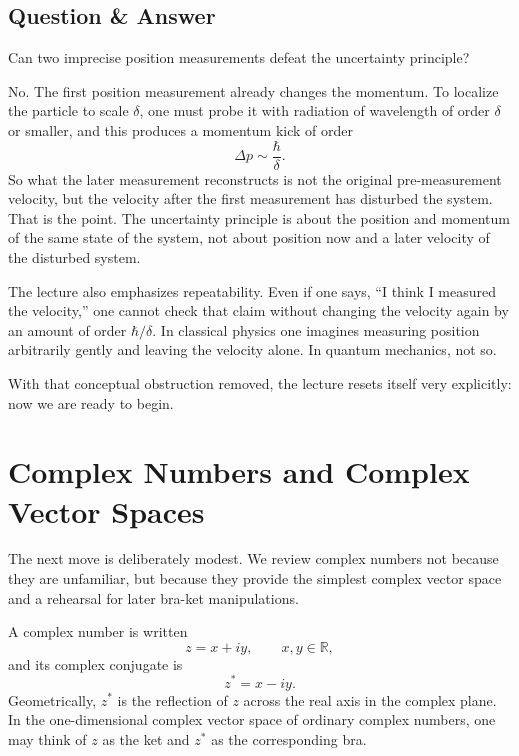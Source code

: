 \subsection{Question \& Answer}

Can two imprecise position measurements defeat the uncertainty principle?

No. The first position measurement already changes the momentum. To localize the particle to scale \(\delta\), one must probe it with radiation of wavelength of order \(\delta\) or smaller, and this produces a momentum kick of order
\begin{equation}
\Delta p \sim \frac{\hbar}{\delta}.
\end{equation}
So what the later measurement reconstructs is not the original pre-measurement velocity, but the velocity after the first measurement has disturbed the system. That is the point. The uncertainty principle is about the position and momentum of the same state of the system, not about position now and a later velocity of the disturbed system.

The lecture also emphasizes repeatability. Even if one says, ``I think I measured the velocity,'' one cannot check that claim without changing the velocity again by an amount of order \(\hbar/\delta\). In classical physics one imagines measuring position arbitrarily gently and leaving the velocity alone. In quantum mechanics, not so.

With that conceptual obstruction removed, the lecture resets itself very explicitly: now we are ready to begin.

\section{Complex Numbers and Complex Vector Spaces}

The next move is deliberately modest. We review complex numbers not because they are unfamiliar, but because they provide the simplest complex vector space and a rehearsal for later bra-ket manipulations.

A complex number is written
\begin{equation}
z = x + i y,
\qquad x,y \in \mathbb{R},
\end{equation}
and its complex conjugate is
\begin{equation}
z^* = x - i y.
\end{equation}
Geometrically, \(z^*\) is the reflection of \(z\) across the real axis in the complex plane. In the one-dimensional complex vector space of ordinary complex numbers, one may think of \(z\) as the ket and \(z^*\) as the corresponding bra.

